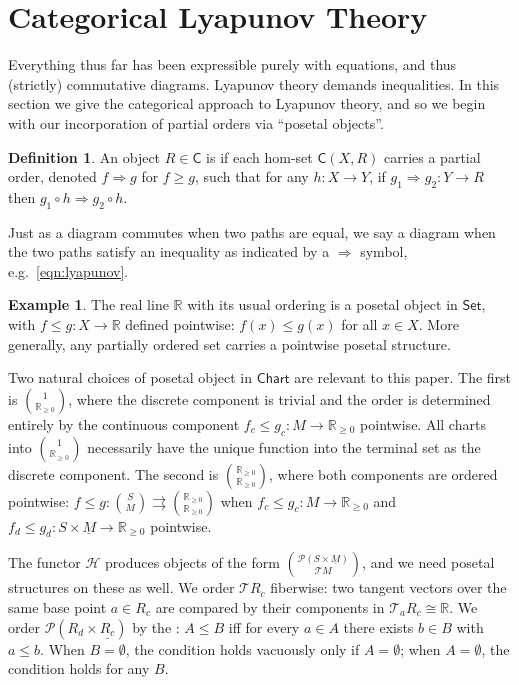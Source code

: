 \documentclass[letterpaper, 10 pt, conference]{IEEEconf}
\theoremstyle{definition}
\newtheorem{defn}[thm]{Definition}
\newtheorem{example}[thm]{Example}
\newcommand{\define}[1]{{\bf \boldmath{#1}}}
\newcommand{\maps}{\colon}
\newcommand{\R}{\mathbb R}
\newcommand{\namedcat}[1]{\mathsf{#1}}
\newcommand{\C}{\namedcat{C}}
\newcommand{\Chart}{\namedcat{Chart}}
\newcommand{\Set}{\namedcat{Set}}
\newcommand{\functor}[1]{\mathcal{#1}}
\renewcommand{\H}{\functor{H}}
\renewcommand{\P}{\functor{P}}
\newcommand{\T}{\functor{T}}
\begin{document}
\section{Categorical Lyapunov Theory}
\label{sec:lyapunov}

Everything thus far has been expressible purely with equations, and thus (strictly) commutative diagrams. Lyapunov theory demands inequalities. In this section we give the categorical approach to Lyapunov theory, and so we begin with our incorporation of partial orders via ``posetal objects''.


\begin{defn}
\label{def:posetal}
    An object $R \in \C$ is \define{posetal} if each hom-set $\C(X, R)$ carries a partial order, denoted $f \Rightarrow g$ for $f \geq g$, such that for any $h \maps X \to Y$, if $g_1 \Rightarrow g_2 \maps Y \to R$ then $g_1 \circ h \Rightarrow g_2 \circ h$.
\end{defn}

Just as a diagram commutes when two paths are equal, we say a diagram \define{lax commutes} when the two paths satisfy an inequality as indicated by a $\Rightarrow$ symbol, e.g.\ \eqref{eqn:lyapunov}.

\begin{example}
\label{ex:posetal2}
    The real line $\R$ with its usual ordering is a posetal object in $\Set$, with $f \leq g \maps X \to \R$ defined pointwise: $f(x) \leq g(x)$ for all $x \in X$. More generally, any partially ordered set carries a pointwise posetal structure.
    
    Two natural choices of posetal object in $\Chart$ are relevant to this paper. The first is $\binom{1}{\R_{\geq 0}}$, where the discrete component is trivial and the order is determined entirely by the continuous component $f_c \leq g_c \maps M \to \R_{\geq 0}$ pointwise. All charts into $\binom{1}{\R_{\geq 0}}$ necessarily have the unique function into the terminal set as the discrete component. The second is $\binom{\R_{\geq 0}}{\R_{\geq 0}}$, where both components are ordered pointwise: $f \leq g \maps \binom{S}{M} \rightrightarrows \binom{\R_{\geq 0}}{\R_{\geq 0}}$ when $f_c \leq g_c \maps M \to \R_{\geq 0}$ and $f_d \leq g_d \maps S \times \underline{M} \to \R_{\geq 0}$ pointwise. 
    
    The functor $\H$ produces objects of the form $\binom{\P(S \times \underline{M})}{\T M}$, and we need posetal structures on these as well. We order $\T R_c$ fiberwise: two tangent vectors over the same base point $a \in R_c$ are compared by their components in $\T_a R_c \cong \R$. We order $\P(R_d \times \underline{R_c})$ by the \define{Hoare order}: $A \leq B$ iff for every $a \in A$ there exists $b \in B$ with $a \leq b$. When $B = \emptyset$, the condition holds vacuously only if $A = \emptyset$; when $A = \emptyset$, the condition holds for any $B$. %
\end{example}
\end{document}
